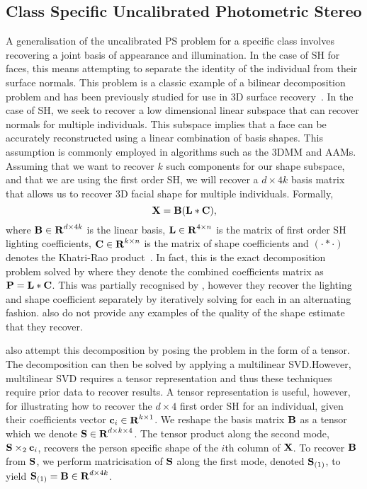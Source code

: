 \subsection{Class Specific Uncalibrated Photometric Stereo}\label{subsec:class_uncalibrated_ps}
A generalisation of the uncalibrated PS problem for a specific class involves
recovering a joint basis of appearance and illumination. In the case of SH for
faces, this means attempting to separate the identity of the individual from
their surface normals. This problem is a classic example of a bilinear
decomposition problem and has been previously studied for use in 3D surface
recovery~\cite{Zhou:bl,RefWorks:306,RefWorks:307,Lee:2005bc,RefWorks:311}. In
the case of SH, we seek to recover a low dimensional linear subspace that can
recover normals for multiple individuals. This subspace implies that a face can
be accurately reconstructed using a linear combination of basis shapes. This
assumption is commonly employed in algorithms such as the 3DMM and AAMs.
Assuming that we want to recover $k$ such components for our shape subspace, and
that we are using the first order SH, we will recover a $d \times 4k$ basis
matrix that allows us to recover 3D facial shape for multiple individuals.
Formally,
\begin{equation}\label{eq:class_specific_ps}
        \boldsymbol{\mathbf{X}} = \boldsymbol{\mathbf{B}} (\boldsymbol{\mathbf{L}} \ast \boldsymbol{\mathbf{C}}),
\end{equation}
where $\boldsymbol{\mathbf{B}} \in \boldsymbol{\mathbf{R}}^{d \times 4k}$ is the linear basis,
$\boldsymbol{\mathbf{L}} \in \boldsymbol{\mathbf{R}}^{4 \times n}$ is the matrix of first order SH lighting
coefficients, $\boldsymbol{\mathbf{C}} \in \boldsymbol{\mathbf{R}}^{k \times n}$ is the matrix of shape
coefficients and $(\cdot \ast \cdot)$ denotes the Khatri-Rao
product~\cite{Khatri:1968dj}. In fact, this is the exact decomposition problem
solved by \citet{RefWorks:311} where they denote the combined coefficients
matrix as $\boldsymbol{\mathbf{P}} = \boldsymbol{\mathbf{L}} \ast \boldsymbol{\mathbf{C}}$. This was partially
recognised by \citet{Zhou:bl}, however they recover the lighting and shape
coefficient separately by iteratively solving for each in an alternating
fashion. \citet{Zhou:bl} also do not provide any examples of the quality of the
shape estimate that they recover.

\citet{RefWorks:306,RefWorks:307} also attempt this decomposition by
posing the problem in the form of a tensor. The decomposition can then be solved
by applying a multilinear SVD.\@ However, multilinear SVD requires a tensor
representation and thus these techniques require prior data to recover results.
A tensor representation is useful, however, for illustrating how to recover the
$d \times 4$ first order SH for an individual, given their coefficients vector
$\boldsymbol{\mathbf{c}}_i \in \boldsymbol{\mathbf{R}}^{k \times 1}$. We reshape the basis matrix
$\boldsymbol{\mathbf{B}}$ as a tensor which we denote $\boldsymbol{\mathbf{S}} \in \boldsymbol{\mathbf{R}}^{d \times k
\times 4}$. The tensor product along the second mode, $\boldsymbol{\mathbf{S}} \times_2 \boldsymbol{\mathbf{c}}_i$, 
recovers the person specific shape of the $i$th column of
$\boldsymbol{\mathbf{X}}$. To recover $\boldsymbol{\mathbf{B}}$ from $\boldsymbol{\mathbf{S}}$, we perform
matricisation of $\boldsymbol{\mathbf{S}}$ along the first mode, denoted $\boldsymbol{\mathbf{S}}_{(1)}$,
to yield $\boldsymbol{\mathbf{S}}_{(1)} = \boldsymbol{\mathbf{B}} \in \boldsymbol{\mathbf{R}}^{d \times 4k}$.

